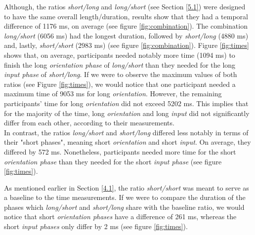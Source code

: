 Although, the ratios \textit{short/long} and \textit{long/short} (see Section \ref{5.1}) were designed to have the same overall length/duration, results show that they had a temporal difference of 1176 ms, on average (see figure \ref{fig:combination}). The combination \textit{long/short} (6056 ms) had the longest duration, followed by \textit{short/long} (4880 ms) and, lastly, \textit{short/short} (2983 ms) (see figure \ref{fig:combination}). Figure \ref{fig:times} shows that, on average, participants needed notably more time (1094 ms) to finish the long \textit{orientation phase} of \textit{long/short} than they needed for the long \textit{input phase} of \textit{short/long}. If we were to observe the maximum values of both ratios (see Figure \ref{fig:times}), we would notice that one participant needed a maximum time of 9053 ms for long \textit{orientation}. However, the remaining participants' time for long \textit{orientation} did not exceed 5202 ms. This implies that for the majority of the time, long \textit{orientation} and long \textit{input} did not significantly differ from each other, according to their measurements. \\
In contrast, the ratios \textit{long/short} and \textit{short/long} differed less notably in terms of their "short phases", meaning short \textit{orientation} and short \textit{input}. On average, they differed by 572 ms. Nonetheless, participants needed more time for the short \textit{orientation phase} than they needed for the short \textit{input phase} (see figure \ref{fig:times}).

As mentioned earlier in Section \ref{4.1}, the ratio \textit{short/short} was meant to serve as a baseline to the time measurements. If we were to compare the duration of the phases which \textit{long/short} and \textit{short/long} share with the baseline ratio, we would notice that short \textit{orientation phases} have a difference of 261 ms, whereas the short \textit{input phases} only differ by 2 ms (see figure \ref{fig:times}).  

